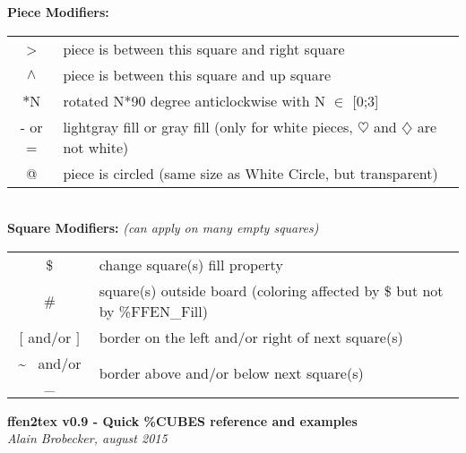 \documentclass[10pt,a4paper]{article}
\begin{document}
\noindent
{\bf Piece Modifiers:}\\
\begin{tabular}{cl}
\textgreater & piece is between this square and right square\\
$\wedge$ & piece is between this square and up square\\
$\ast$N  & rotated N*90 degree anticlockwise with N $\in$ [0;3]\\
- or =& lightgray fill or gray fill (only for white pieces, $\heartsuit$ and $\diamondsuit$ are not white)\\
@ & piece is circled (same size as White Circle, but transparent)
\end{tabular}
~\\

\noindent
{\bf Square Modifiers:} {\sl (can apply on many empty squares)}\\
\begin{tabular}{cl}
\$ & change square(s) fill property\\
\# & square(s) outside board (coloring affected by \$ but not by \%FFEN\_Fill)\\
$[$ and/or $]$ & border on the left and/or right of next square(s)\\
\~ ~and/or \_ & border above and/or below next square(s)\\
\end{tabular}

\newpage
\begin{center}
{\bf ffen2tex v0.9 - Quick \%{CUBES} reference and examples}\\
{\sl Alain Brobecker, august 2015}
\end{center}
\end{document}
